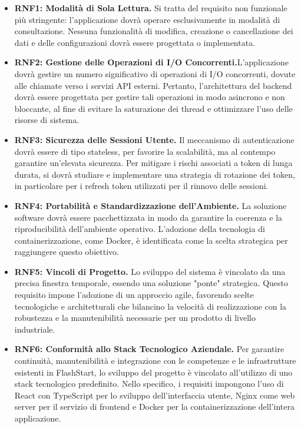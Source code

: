 \documentclass[12pt,a4paper,openright,twoside]{book}
\begin{document}
\begin{itemize}
    \item \textbf{RNF1: Modalità di Sola Lettura.} Si tratta del requisito non funzionale più stringente: l'applicazione dovrà operare esclusivamente in modalità di consultazione. Nessuna funzionalità di modifica, creazione o cancellazione dei dati e delle configurazioni dovrà essere progettata o implementata.

    \item \textbf{RNF2: Gestione delle Operazioni di I/O Concorrenti.}L'applicazione dovrà gestire un numero significativo di operazioni di I/O concorrenti, dovute alle chiamate verso i servizi API esterni. Pertanto, l'architettura del backend dovrà essere progettata per gestire tali operazioni in modo asincrono e non bloccante, al fine di evitare la saturazione dei thread e ottimizzare l'uso delle risorse di sistema.

    \item \textbf{RNF3: Sicurezza delle Sessioni Utente.} Il meccanismo di autenticazione dovrà essere di tipo stateless, per favorire la scalabilità, ma al contempo garantire un'elevata sicurezza. Per mitigare i rischi associati a token di lunga durata, si dovrà studiare e implementare una strategia di rotazione dei token, in particolare per i refresh token utilizzati per il rinnovo delle sessioni.

    \item \textbf{RNF4: Portabilità e Standardizzazione dell'Ambiente.} La soluzione software dovrà essere pacchettizzata in modo da garantire la coerenza e la riproducibilità dell'ambiente operativo. L'adozione della tecnologia di containerizzazione, come Docker, è identificata come la scelta strategica per raggiungere questo obiettivo.

    \item \textbf{RNF5: Vincoli di Progetto.} Lo sviluppo del sistema è vincolato da una precisa finestra temporale, essendo una soluzione "ponte" strategica. Questo requisito impone l'adozione di un approccio agile, favorendo scelte tecnologiche e architetturali che bilancino la velocità di realizzazione con la robustezza e la manutenibilità necessarie per un prodotto di livello industriale.
    
    \item \textbf{RNF6: Conformità allo Stack Tecnologico Aziendale.} Per garantire continuità, manutenibilità e integrazione con le competenze e le infrastrutture esistenti in FlashStart, lo sviluppo del progetto è vincolato all'utilizzo di uno stack tecnologico predefinito. Nello specifico, i requisiti impongono l'uso di React con TypeScript per lo sviluppo dell'interfaccia utente, Nginx come web server per il servizio di frontend e Docker per la containerizzazione dell'intera applicazione.
\end{itemize}
\end{document}
